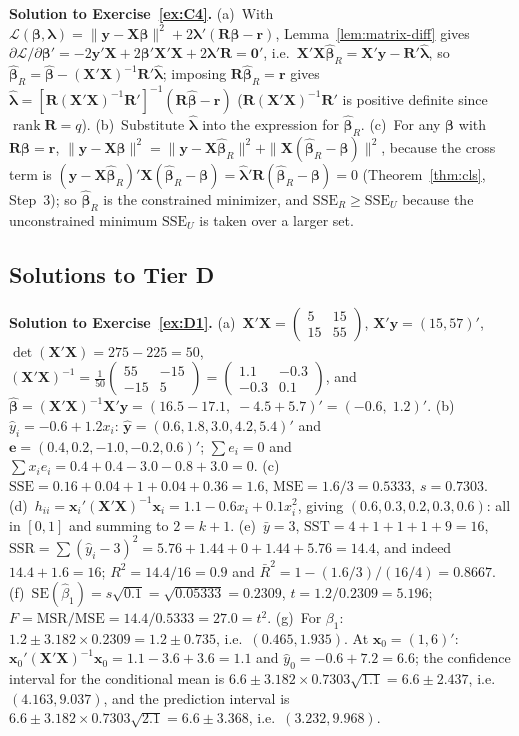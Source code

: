 \documentclass[12pt,a4paper]{article}
\theoremstyle{definition}
\DeclareMathOperator\rank{rank}
\newcommand{\SST}{\mathrm{SST}}
\newcommand{\SSR}{\mathrm{SSR}}
\newcommand{\SSE}{\mathrm{SSE}}
\newcommand{\MSR}{\mathrm{MSR}}
\newcommand{\MSE}{\mathrm{MSE}}
\newcommand{\SE}{\mathrm{SE}}
\newcommand{\bX}{\mathbf{X}}
\newcommand{\by}{\mathbf{y}}
\newcommand{\bx}{\mathbf{x}}
\def\bb{\boldsymbol{\beta}}
\newcommand{\bR}{\mathbf{R}}
\newcommand{\br}{\mathbf{r}}
\newcommand{\bzero}{\mathbf{0}}
\begin{document}
\textbf{Solution to Exercise~\ref{ex:C4}.} (a)~With $\mathcal{L}(\bb, \boldsymbol\lambda) = \|\by - \bX\bb\|^2 + 2\boldsymbol\lambda'(\bR\bb - \br)$, Lemma~\ref{lem:matrix-diff} gives $\partial\mathcal{L}/\partial\bb' = -2\by'\bX + 2\bb'\bX'\bX + 2\boldsymbol\lambda'\bR = \bzero'$, i.e.\ $\bX'\bX\hat{\bb}_R = \bX'\by - \bR'\hat{\boldsymbol\lambda}$, so $\hat{\bb}_R = \hat{\bb} - (\bX'\bX)^{-1}\bR'\hat{\boldsymbol\lambda}$; imposing $\bR\hat{\bb}_R = \br$ gives $\hat{\boldsymbol\lambda} = [\bR(\bX'\bX)^{-1}\bR']^{-1}(\bR\hat{\bb} - \br)$ ($\bR(\bX'\bX)^{-1}\bR'$ is positive definite since $\rank\bR = q$). (b)~Substitute $\hat{\boldsymbol\lambda}$ into the expression for $\hat{\bb}_R$. (c)~For any $\bb$ with $\bR\bb = \br$, $\|\by - \bX\bb\|^2 = \|\by - \bX\hat{\bb}_R\|^2 + \|\bX(\hat{\bb}_R - \bb)\|^2$, because the cross term is $(\by - \bX\hat{\bb}_R)'\bX(\hat{\bb}_R - \bb) = \hat{\boldsymbol\lambda}'\bR(\hat{\bb}_R - \bb) = 0$ (Theorem~\ref{thm:cls}, Step~3); so $\hat{\bb}_R$ is the constrained minimizer, and $\SSE_R \geqslant \SSE_U$ because the unconstrained minimum $\SSE_U$ is taken over a larger set.

\subsection*{Solutions to Tier D}

\textbf{Solution to Exercise~\ref{ex:D1}.} (a)~$\bX'\bX = \begin{pmatrix}5 & 15\\ 15 & 55\end{pmatrix}$, $\bX'\by = (15, 57)'$, $\det(\bX'\bX) = 275 - 225 = 50$, $(\bX'\bX)^{-1} = \frac{1}{50}\begin{pmatrix}55 & -15\\ -15 & 5\end{pmatrix} = \begin{pmatrix}1.1 & -0.3\\ -0.3 & 0.1\end{pmatrix}$, and $\hat{\bb} = (\bX'\bX)^{-1}\bX'\by = (16.5 - 17.1,\; -4.5 + 5.7)' = (-0.6,\; 1.2)'$. (b)~$\hat{y}_i = -0.6 + 1.2x_i$: $\hat{\by} = (0.6, 1.8, 3.0, 4.2, 5.4)'$ and $\mathbf{e} = (0.4, 0.2, -1.0, -0.2, 0.6)'$; $\sum e_i = 0$ and $\sum x_ie_i = 0.4 + 0.4 - 3.0 - 0.8 + 3.0 = 0$. (c)~$\SSE = 0.16 + 0.04 + 1 + 0.04 + 0.36 = 1.6$, $\MSE = 1.6/3 = 0.5333$, $s = 0.7303$. (d)~$h_{ii} = \bx_i'(\bX'\bX)^{-1}\bx_i = 1.1 - 0.6x_i + 0.1x_i^2$, giving $(0.6, 0.3, 0.2, 0.3, 0.6)$: all in $[0,1]$ and summing to $2 = k+1$. (e)~$\bar y = 3$, $\SST = 4+1+1+1+9 = 16$, $\SSR = \sum(\hat y_i - 3)^2 = 5.76 + 1.44 + 0 + 1.44 + 5.76 = 14.4$, and indeed $14.4 + 1.6 = 16$; $R^2 = 14.4/16 = 0.9$ and $\bar{R}^2 = 1 - (1.6/3)/(16/4) = 0.8667$. (f)~$\SE(\hat\beta_1) = s\sqrt{0.1} = \sqrt{0.05333} = 0.2309$, $t = 1.2/0.2309 = 5.196$; $F = \MSR/\MSE = 14.4/0.5333 = 27.0 = t^2$. (g)~For $\beta_1$: $1.2 \pm 3.182 \times 0.2309 = 1.2 \pm 0.735$, i.e.\ $(0.465, 1.935)$. At $\bx_0 = (1, 6)'$: $\bx_0'(\bX'\bX)^{-1}\bx_0 = 1.1 - 3.6 + 3.6 = 1.1$ and $\hat y_0 = -0.6 + 7.2 = 6.6$; the confidence interval for the conditional mean is $6.6 \pm 3.182 \times 0.7303\sqrt{1.1} = 6.6 \pm 2.437$, i.e.\ $(4.163, 9.037)$, and the prediction interval is $6.6 \pm 3.182 \times 0.7303\sqrt{2.1} = 6.6 \pm 3.368$, i.e.\ $(3.232, 9.968)$.
\end{document}
